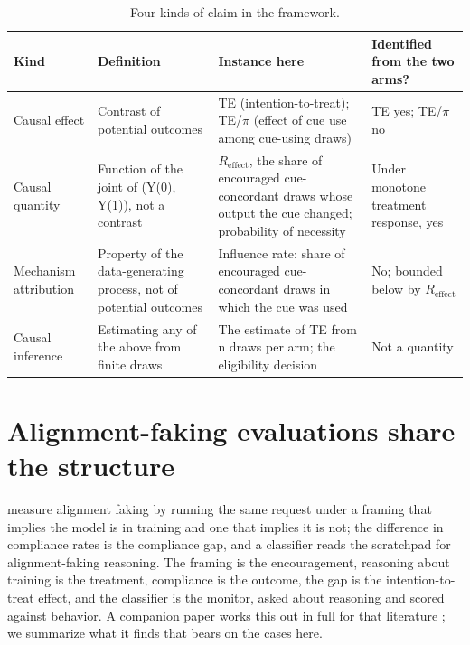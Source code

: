 \documentclass[11pt]{article}
\begin{document}
\begin{table}[H]
  \centering\small
  \begin{tabularx}{\linewidth}{@{}>{\raggedright\arraybackslash}p{3.1cm}XXX@{}}
    \toprule
    Kind & Definition & Instance here & Identified from the two arms? \\
    \midrule
    Causal effect & Contrast of potential outcomes & TE (intention-to-treat); TE/$\pi$ (effect of cue use among cue-using draws) & TE yes; TE/$\pi$ no \\ \addlinespace[3pt]
    Causal quantity & Function of the joint of (Y(0), Y(1)), not a contrast & $R_{\mathrm{effect}}$, the share of encouraged cue-concordant draws whose output the cue changed; probability of necessity & Under monotone treatment response, yes \\ \addlinespace[3pt]
    Mechanism attribution & Property of the data-generating process, not of potential outcomes & Influence rate: share of encouraged cue-concordant draws in which the cue was used & No; bounded below by $R_{\mathrm{effect}}$ \\ \addlinespace[3pt]
    Causal inference & Estimating any of the above from finite draws & The estimate of TE from n draws per arm; the eligibility decision & Not a quantity \\
    \bottomrule
  \end{tabularx}
  \caption{Four kinds of claim in the framework.}
\end{table}


\section{Alignment-faking evaluations share the structure}
\citet{greenblatt2024alignment} measure alignment faking by running the same request under a framing that implies the model is in training and one that implies it is not; the difference in compliance rates is the compliance gap, and a classifier reads the scratchpad for alignment-faking reasoning. The framing is the encouragement, reasoning about training is the treatment, compliance is the outcome, the gap is the intention-to-treat effect, and the classifier is the monitor, asked about reasoning and scored against behavior. A companion paper works this out in full for that literature \citep{diamond2026scratchpad}; we summarize what it finds that bears on the cases here.
\end{document}
